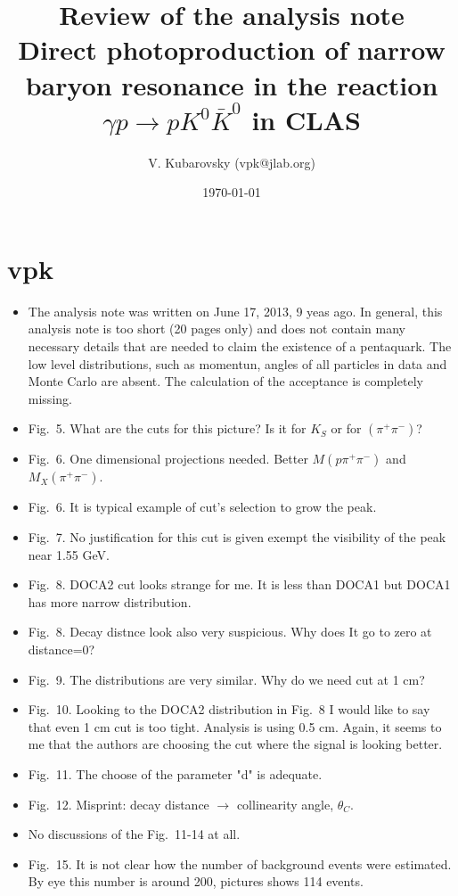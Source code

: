 \documentclass[12pt]{article}
\title{Review of the analysis note\\
Direct photoproduction of narrow baryon resonance in the reaction
$\gamma p\to pK^0 \bar K^0$ in CLAS
}
\author{
V. Kubarovsky (vpk@jlab.org)\\
}
\date{\today}
\begin{document}
\maketitle{}

\newpage
   \section{vpk}
\begin{itemize}
\item The analysis note was written on June 17, 2013, 9 yeas ago.
In general, this analysis note is too short (20 pages only) and does not contain many necessary details that are needed to claim the existence of a pentaquark. The low level distributions, such as momentun, angles of all particles in data and Monte Carlo are absent. The calculation of the acceptance is completely missing.
\item Fig.~5. What are the cuts for this picture? Is it for $K_S$ or for $(\pi^+\pi^-)$?
\item Fig.~6. One dimensional projections needed. Better $M(p\pi^+\pi^-)$ and $M_X(\pi^+\pi^-)$.
\item Fig.~6. It is typical example of cut's selection to grow the peak.
\item Fig.~7. No justification for this cut is given exempt the visibility of the peak near 1.55 GeV.
\item Fig.~8. DOCA2 cut looks strange for me. It is less than DOCA1 but DOCA1 has more narrow distribution.
\item Fig.~8. Decay distnce look also very suspicious. Why does It go to zero at distance=0?
\item Fig.~9. The distributions are very similar. Why do we need cut at 1 cm?
\item Fig.~10. Looking to the DOCA2 distribution in Fig.~8 I would like to say that  even 1 cm cut is too tight. Analysis is using 0.5 cm.
Again, it seems to me that  the authors are choosing the cut where the signal is looking better.
\item Fig.~11. The choose of the parameter "d" is adequate. 
\item Fig.~12. Misprint: decay distance $\to$ collinearity angle, $\theta_C$.
\item No discussions of the Fig.~11-14 at all.
\item Fig.~15. It is not clear how the number of background events were estimated. By eye this number is around 200, pictures shows 114 events.

\end{itemize}
\end{document}
